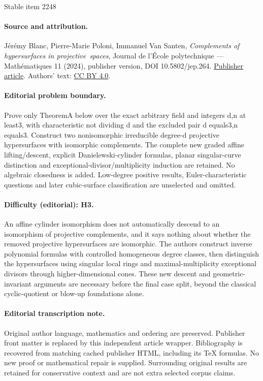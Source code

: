 \documentclass[11pt]{article}
\theoremstyle{definition}
\begin{document}
\begin{center}{\Large Stable item 2248}\end{center}
\paragraph{Source and attribution.}
Jérémy Blanc, Pierre-Marie Poloni, Immanuel Van Santen, \emph{Complements of hypersurfaces in projective spaces}, Journal de l’École polytechnique — Mathématiques 11 (2024), publisher version, DOI 10.5802/jep.264. \href{https://jep.centre-mersenne.org/articles/10.5802/jep.264/}{Publisher article}. Authors' text: \href{https://creativecommons.org/licenses/by/4.0/}{CC BY 4.0}.
\paragraph{Editorial problem boundary.}
Prove only TheoremA below over the exact arbitrary field and integers d,n at least3, with characteristic not dividing d and the excluded pair d equals3,n equals3. Construct two nonisomorphic irreducible degree-d projective hypersurfaces with isomorphic complements. The complete new graded affine lifting/descent, explicit Danielewski-cylinder formulas, planar singular-curve distinction and exceptional-divisor/multiplicity induction are retained. No algebraic closedness is added. Low-degree positive results, Euler-characteristic questions and later cubic-surface classification are unselected and omitted.
\paragraph{Difficulty (editorial): H3.}
An affine cylinder isomorphism does not automatically descend to an isomorphism of projective complements, and it says nothing about whether the removed projective hypersurfaces are isomorphic. The authors construct inverse polynomial formulas with controlled homogeneous degree classes, then distinguish the hypersurfaces using singular local rings and maximal-multiplicity exceptional divisors through higher-dimensional cones. These new descent and geometric-invariant arguments are necessary before the final case split, beyond the classical cyclic-quotient or blow-up foundations alone.
\paragraph{Editorial transcription note.}
Original author language, mathematics and ordering are preserved. Publisher front matter is replaced by this independent article wrapper. Bibliography is recovered from matching cached publisher HTML, including its TeX formulas. No new proof or mathematical repair is supplied. Surrounding original results are retained for conservative context and are not extra selected corpus claims.
\clearpage
\end{document}
